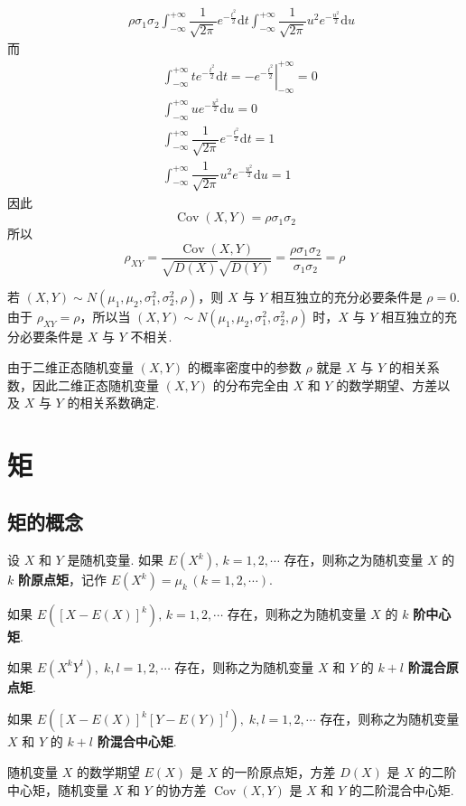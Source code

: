 \begin{myproof}
$$\begin{aligned}
        & \; \rho \sigma_1 \sigma_2 \int_{-\infty}^{+\infty} \dfrac{1}{\sqrt{2 \pi}} e^{-\frac{t^2}{2}} \text{d}t \int_{-\infty}^{+\infty} \dfrac{1}{\sqrt{2 \pi}} u^2 e^{-\frac{u^2}{2}} \text{d}u
    \end{aligned}
    $$
    而
    $$
    \begin{aligned}
        & \int_{-\infty}^{+\infty} t e^{-\frac{t^2}{2}} \text{d}t = \left. -e^{-\frac{t^2}{2}} \right|_{-\infty}^{+\infty} = 0 \\
        & \int_{-\infty}^{+\infty} u e^{-\frac{u^2}{2}} \text{d}u = 0 \\
        & \int_{-\infty}^{+\infty} \dfrac{1}{\sqrt{2 \pi}} e^{-\frac{t^2}{2}} \text{d}t = 1 \\
        & \int_{-\infty}^{+\infty} \dfrac{1}{\sqrt{2 \pi}} u^2 e^{-\frac{u^2}{2}} \text{d}u = 1
    \end{aligned}
    $$
    因此
    $$
    \operatorname{Cov}(X,Y) = \rho \sigma_1 \sigma_2
    $$
    所以
    $$
    \rho_{XY} = \dfrac{\operatorname{Cov}(X,Y)}{\sqrt{D(X)} \sqrt{D(Y)}} = \dfrac{\rho \sigma_1 \sigma_2}{\sigma_1 \sigma_2} = \rho
    $$
\end{myproof}

若 $(X,Y) \sim N(\mu_1,\mu_2,\sigma_1^2,\sigma_2^2,\rho)$，则 $X$ 与 $Y$ 相互独立的充分必要条件是 $\rho=0$. 由于 $\rho_{XY} = \rho$，所以当 $(X,Y) \sim N(\mu_1,\mu_2,\sigma_1^2,\sigma_2^2,\rho)$ 时，$X$ 与 $Y$ 相互独立的充分必要条件是 $X$ 与 $Y$ 不相关.

由于二维正态随机变量 $(X,Y)$ 的概率密度中的参数 $\rho$ 就是 $X$ 与 $Y$ 的相关系数，因此二维正态随机变量 $(X,Y)$ 的分布完全由 $X$ 和 $Y$ 的数学期望、方差以及 $X$ 与 $Y$ 的相关系数确定.

\section{矩}

\subsection{矩的概念}

\begin{definition}
    设 $X$ 和 $Y$ 是随机变量. 如果 $E(X^k), \, k=1,2,\cdots$ 存在，则称之为随机变量 $X$ 的 $k$ \textbf{阶原点矩}，记作 $E(X^k) = \mu_k \, (k=1,2,\cdots)$.

    如果 $E([X-E(X)]^k), \, k=1,2,\cdots$ 存在，则称之为随机变量 $X$ 的 $k$ \textbf{阶中心矩}.

    如果 $E(X^k Y^l), \; k,l=1,2,\cdots$ 存在，则称之为随机变量 $X$ 和 $Y$ 的 $k+l$ \textbf{阶混合原点矩}.

    如果 $E([X-E(X)]^k [Y-E(Y)]^l), \; k,l=1,2,\cdots$ 存在，则称之为随机变量 $X$ 和 $Y$ 的 $k+l$ \textbf{阶混合中心矩}.
\end{definition}

随机变量 $X$ 的数学期望 $E(X)$ 是 $X$ 的一阶原点矩，方差 $D(X)$ 是 $X$ 的二阶中心矩，随机变量 $X$ 和 $Y$ 的协方差 $\operatorname{Cov}(X,Y)$ 是 $X$ 和 $Y$ 的二阶混合中心矩.